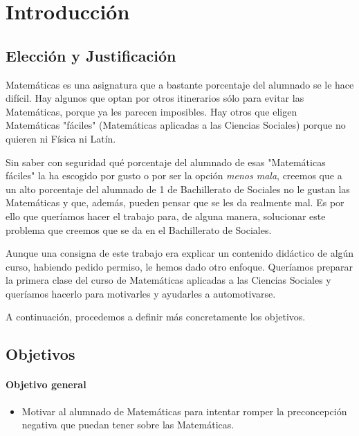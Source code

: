 
\section{Introducción}


\subsection{Elección y Justificación}

Matemáticas es una asignatura que a bastante porcentaje del alumnado se le hace difícil. 
%
Hay algunos que optan por otros itinerarios sólo para evitar las Matemáticas, porque ya les parecen imposibles.
%
Hay otros que eligen Matemáticas "fáciles" (Matemáticas aplicadas a las Ciencias Sociales) porque no quieren ni Física ni Latín.

Sin saber con seguridad qué porcentaje del alumnado de esas "Matemáticas fáciles" la ha escogido por gusto o por ser la opción \textit{menos mala}, creemos que a un alto porcentaje del alumnado de 1 de Bachillerato de Sociales no le gustan las Matemáticas y que, además, pueden pensar que se les da realmente mal. 
%
Es por ello que queríamos hacer el trabajo para, de alguna manera, solucionar este problema que creemos que se da en el Bachillerato de Sociales.

Aunque una consigna de este trabajo era explicar un contenido didáctico de algún curso, habiendo pedido permiso, le hemos dado otro enfoque. 
%
Queríamos preparar la primera clase del curso de Matemáticas aplicadas a las Ciencias Sociales y queríamos hacerlo para motivarles y ayudarles a automotivarse.

A continuación, procedemos a definir más concretamente los objetivos.


\subsection{Objetivos}

\paragraph{Objetivo general}
\begin{itemize}
	\item Motivar al alumnado de Matemáticas para intentar romper la preconcepción negativa que puedan tener sobre las Matemáticas. 
\end{itemize}

